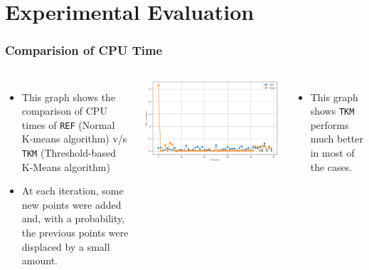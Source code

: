 \documentclass{beamer}
\begin{document}
\section{Experimental Evaluation}
\begin{frame}
  \frametitle{Comparision of CPU Time}

  \begin{columns}

    \begin{itemize}
      \item This graph shows the comparison of CPU times of \texttt{REF} (Normal K-means algorithm) v/s \texttt{TKM} (Threshold-based K-Means algorithm)
      \item At each iteration, some new points were added and, with a probability, the previous points were displaced by a small amount.


    \end{itemize}

    \includegraphics[width=1\textwidth]{Diff.png}
    \begin{itemize}
      \vspace{-0.2cm}
      \item \small This graph shows \texttt{TKM} performs much better in most of the cases.
    \end{itemize}
  \end{columns}
\end{frame}
\end{document}
